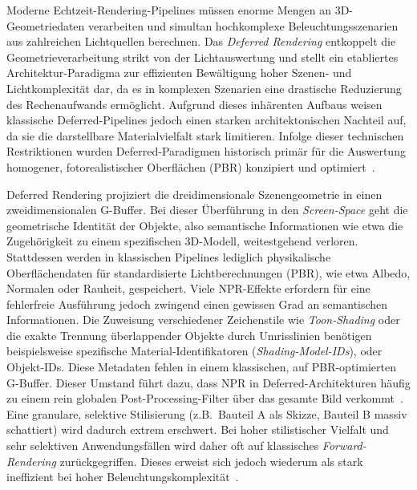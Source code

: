 Moderne Echtzeit-Rendering-Pipelines müssen enorme Mengen an 3D-Geometriedaten verarbeiten und simultan hochkomplexe
Beleuchtungsszenarien aus zahlreichen Lichtquellen berechnen.
Das \textit{Deferred Rendering} entkoppelt die Geometrieverarbeitung strikt von der Lichtauswertung und stellt ein
etabliertes Architektur-Paradigma zur effizienten Bewältigung hoher Szenen- und Lichtkomplexität dar, da es in komplexen
Szenarien eine drastische Reduzierung des Rechenaufwands ermöglicht.
Aufgrund dieses inhärenten Aufbaus weisen klassische Deferred-Pipelines jedoch einen starken architektonischen Nachteil
auf, da sie die darstellbare Materialvielfalt stark limitieren.
Infolge dieser technischen Restriktionen wurden Deferred-Paradigmen historisch primär für die Auswertung homogener,
fotorealistischer Oberflächen (\ac{PBR}) konzipiert und
optimiert~\cite[Abschn.~1]{haradaForwardBringingDeferred2012}.

Deferred Rendering projiziert die dreidimensionale Szenengeometrie in einen zweidimensionalen \ac{G-Buffer}.
Bei dieser Überführung in den \textit{Screen-Space} geht die geometrische Identität der Objekte, also semantische
Informationen wie etwa die Zugehörigkeit zu einem spezifischen 3D-Modell, weitestgehend verloren.
Stattdessen werden in klassischen Pipelines lediglich physikalische Oberflächendaten für standardisierte
Lichtberechnungen (\ac{PBR}), wie etwa Albedo, Normalen oder Rauheit, gespeichert.
Viele \ac{NPR}-Effekte erfordern für eine fehlerfreie Ausführung jedoch zwingend einen gewissen Grad an semantischen
Informationen.
Die Zuweisung verschiedener Zeichenstile wie \textit{Toon-Shading} oder die exakte Trennung überlappender
Objekte durch Umrisslinien benötigen beispielsweise spezifische Material-Identifikatoren (\textit{Shading-Model-IDs}),
oder Objekt-IDs.
Diese Metadaten fehlen in einem klassischen, auf \ac{PBR}-optimierten \ac{G-Buffer}.
Dieser Umstand führt dazu, dass \ac{NPR} in Deferred-Architekturen häufig zu einem rein globalen Post-Processing-Filter über
das gesamte Bild verkommt~\cite[Abschn.~1]{magdicsPostprocessingNPREffects2013}.
Eine granulare, selektive Stilisierung (z.B.\ Bauteil A als Skizze, Bauteil B massiv schattiert) wird dadurch extrem
erschwert.
Bei hoher stilistischer Vielfalt und sehr selektiven Anwendungsfällen wird daher oft auf klassisches
\textit{Forward-Rendering} zurückgegriffen.
Dieses erweist sich jedoch wiederum als stark ineffizient bei hoher
Beleuchtungskomplexität~\cite[Abschn.~1]{haradaForwardBringingDeferred2012}.

